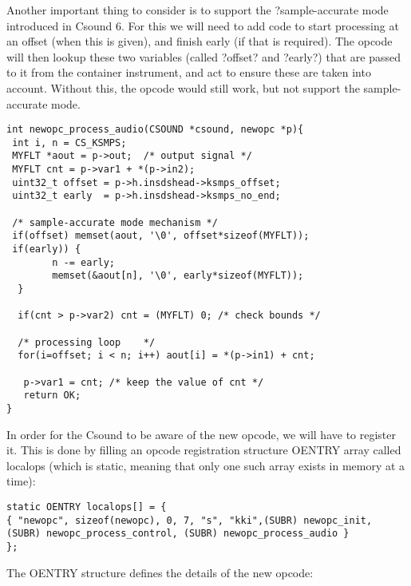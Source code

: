 \documentclass[11pt]{article}
\begin{document}
Another important thing to consider is to support the ?sample-accurate mode introduced in Csound 6. For this we will need to add code to start processing at an offset (when this is given), and finish early (if that is required). The opcode will then lookup these two variables (called ?offset? and ?early?) that are passed to it from the container instrument, and act to ensure these are taken into account. Without this, the opcode would still work, but not support the sample-accurate mode.

\begin{lstlisting}
int newopc_process_audio(CSOUND *csound, newopc *p){
 int i, n = CS_KSMPS;
 MYFLT *aout = p->out;  /* output signal */
 MYFLT cnt = p->var1 + *(p->in2);
 uint32_t offset = p->h.insdshead->ksmps_offset;
 uint32_t early  = p->h.insdshead->ksmps_no_end;

 /* sample-accurate mode mechanism */
 if(offset) memset(aout, '\0', offset*sizeof(MYFLT));
 if(early)) {
        n -= early;
        memset(&aout[n], '\0', early*sizeof(MYFLT));
  }         

  if(cnt > p->var2) cnt = (MYFLT) 0; /* check bounds */
	
  /* processing loop    */
  for(i=offset; i < n; i++) aout[i] = *(p->in1) + cnt;
	
   p->var1 = cnt; /* keep the value of cnt */
   return OK;
}
\end{lstlisting}


In order for the Csound to be aware of the new opcode, we will have to register it. This is done by filling an opcode registration structure OENTRY array called localops (which is static, meaning that only one such array exists in memory at a time):

\begin{lstlisting}
static OENTRY localops[] = {
{ "newopc", sizeof(newopc), 0, 7, "s", "kki",(SUBR) newopc_init, 
(SUBR) newopc_process_control, (SUBR) newopc_process_audio }
};
\end{lstlisting}

The OENTRY structure defines the details of the new opcode:
\end{document}
